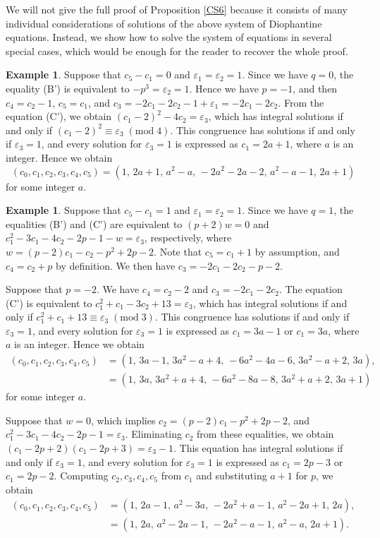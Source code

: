 \documentclass{amsart}
\theoremstyle{plain}
\theoremstyle{definition}
\newtheorem{exmp}[thm]{Example}
\theoremstyle{remark}
\begin{document}
We will not give the full proof of Proposition \ref{CS6} because it consists of many individual 
considerations of solutions of the above system of Diophantine equations. 
Instead, we show how to solve the system of equations in several special cases, 
which would be enough for the reader to recover the whole proof. 

\begin{exmp}
Suppose that $c_5-c_1=0$ and $\varepsilon_1=\varepsilon_2=1$. 
Since we have $q=0$, the equality (B') is equivalent to $-p^3=\varepsilon_2=1$. 
Hence we have $p=-1$, 
and then $c_4=c_2-1$, $c_5=c_1$, and $c_3=-2c_1-2c_2-1+\varepsilon_1=-2c_1-2c_2$. 
From the equation (C'), we obtain $(c_1-2)^2-4c_2=\varepsilon_3$, 
which has integral solutions if and only if $(c_1-2)^2\equiv\varepsilon_3\; (\mathrm{mod}\; 4)$. 
This congruence has solutions if and only if $\varepsilon_3=1$, and 
every solution for $\varepsilon_3=1$ is expressed as $c_1=2a+1$, where $a$ is an integer. 
Hence we obtain 
\[
(c_0,c_1,c_2,c_3,c_4,c_5)=(1,\, 2a+1,\, a^2-a,\, -2a^2-2a-2,\, a^2-a-1,\, 2a+1)
\]
for some integer $a$. 
\end{exmp}

\begin{exmp}
Suppose that $c_5-c_1=1$ and $\varepsilon_1=\varepsilon_2=1$. 
Since we have $q=1$, the equalities (B') and (C') are equivalent to $(p+2)w=0$ 
and $c_1^2-3c_1-4c_2-2p-1-w=\varepsilon_3$, respectively, 
where $w=(p-2)c_1-c_2-p^2+2p-2$. 
Note that $c_5=c_1+1$ by assumption, and $c_4=c_2+p$ by definition. 
We then have $c_3=-2c_1-2c_2-p-2$. 

Suppose that $p=-2$. We have $c_4=c_2-2$ and $c_3=-2c_1-2c_2$. 
The equation (C') is equivalent to $c_1^2+c_1-3c_2+13=\varepsilon_3$, 
which has integral solutions if and only if $c_1^2+c_1+13\equiv\varepsilon_3\; (\mathrm{mod}\; 3)$. 
This congruence has solutions if and only if $\varepsilon_3=1$, and 
every solution for $\varepsilon_3=1$ is expressed as $c_1=3a-1$ or $c_1=3a$, where $a$ is an integer. 
Hence we obtain 
\begin{align*}
(c_0,c_1,c_2,c_3,c_4,c_5) & =(1,\, 3a-1,\, 3a^2-a+4,\, -6a^2-4a-6,\, 3a^2-a+2,\, 3a), \\
& =(1,\, 3a,\, 3a^2+a+4,\, -6a^2-8a-8,\, 3a^2+a+2,\, 3a+1)
\end{align*}
for some integer $a$. 

Suppose that $w=0$, which implies $c_2=(p-2)c_1-p^2+2p-2$, and 
$c_1^2-3c_1-4c_2-2p-1=\varepsilon_3$. 
Eliminating $c_2$ from these equalities, we obtain 
$(c_1-2p+2)(c_1-2p+3)=\varepsilon_3-1$. 
This equation has integral solutions if and only if $\varepsilon_3=1$, and 
every solution for $\varepsilon_3=1$ is expressed as $c_1=2p-3$ or $c_1=2p-2$. 
Computing $c_2,c_3,c_4,c_5$ from $c_1$ and substituting $a+1$ for $p$, we obtain
\begin{align*}
(c_0,c_1,c_2,c_3,c_4,c_5) & =(1,\, 2a-1,\, a^2-3a,\, -2a^2+a-1,\, a^2-2a+1,\, 2a), \\
& =(1,\, 2a,\, a^2-2a-1,\, -2a^2-a-1,\, a^2-a,\, 2a+1). 
\end{align*}
\end{exmp}
\end{document}
